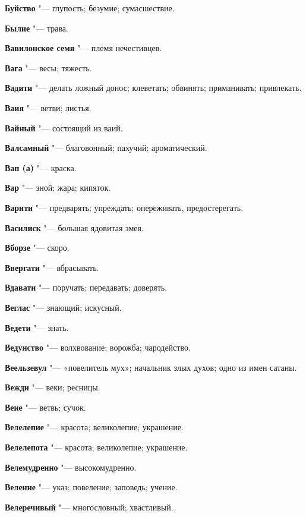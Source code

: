 \begin{mymulticols}
\noindent\textbf{Буйство} "--- глупость; безумие; сумасшествие. 

\noindent\textbf{Былие} "--- трава. 

\bukvaending


\noindent\textbf{Вавилонское семя} "--- племя нечестивцев. 

\noindent\textbf{Вага} "--- весы; тяжесть. 

\noindent\textbf{Вадити} "--- делать ложный донос; клеветать; обвинять; приманивать; привлекать. 

\noindent\textbf{Ваия} "--- ветви; листья. 

\noindent\textbf{Вайный} "--- состоящий из ваий. 

\noindent\textbf{Валсамный} "--- благовонный; пахучий; ароматический. 

\noindent\textbf{Вап (а)} "--- краска. 

\noindent\textbf{Вар} "--- зной; жара; кипяток. 

\noindent\textbf{Варити} "--- предварять; упреждать; опереживать, предостерегать. 

\noindent\textbf{Василиск} "--- большая ядовитая змея. 

\noindent\textbf{Вборзе} "--- скоро. 

\noindent\textbf{Ввергати} "--- вбрасывать. 

\noindent\textbf{Вдавати} "--- поручать; передавать; доверять. 

\noindent\textbf{Веглас} "--- знающий; искусный. 

\noindent\textbf{Ведети} "--- знать. 

\noindent\textbf{Ведунство} "--- волхвование; ворожба; чародейство. 

\noindent\textbf{Веельзевул} "--- «повелитель мух»; начальник злых духов; одно из имен сатаны. 

\noindent\textbf{Вежди} "--- веки; ресницы. 

\noindent\textbf{Веие} "--- ветвь; сучок. 

\noindent\textbf{Велелепие} "--- красота; великолепие; украшение. 

\noindent\textbf{Велелепота} "--- красота; великолепие; украшение. 

\noindent\textbf{Велемудренно} "--- высокомудренно. 

\noindent\textbf{Веление} "--- указ; повеление; заповедь; учение. 

\noindent\textbf{Велеречивый} "--- многословный; хвастливый. 


\end{mymulticols}
